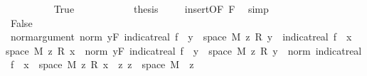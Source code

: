 \begin{isabellebody}
\ \ \ \ \ \ \ \ \isamarkupfalse%
\ True\isanewline
\ \ \ \ \ \ \ \ \isamarkupfalse%
\ \isamarkupfalse%
\ {\isacharquery}{\kern0pt}thesis\ \isamarkupfalse%
\ {\isacharasterisk}{\kern0pt}\ \isamarkupfalse%
\ insert{\isacharparenleft}{\kern0pt}{}{\isacharparenright}{\kern0pt}{\isacharbrackleft}{\kern0pt}OF\ F{\isacharbrackright}{\kern0pt}\ \isamarkupfalse%
\ simp\isanewline
\ \ \ \ \ \ \isamarkupfalse%
\isanewline
\ \ \ \ \ \ \ \ \isamarkupfalse%
\ False\isanewline
\ \ \ \ \ \ \ \ \isamarkupfalse%
\ norm{\isacharunderscore}{\kern0pt}argument{\isacharcolon}{\kern0pt}\ {\isachardoublequoteopen}norm\ {\isacharparenleft}{\kern0pt}{\isacharparenleft}{\kern0pt}{\isasymSum}y{\isasymin}F{\isachardot}{\kern0pt}\ indicat{\isacharunderscore}{\kern0pt}real\ {\isacharparenleft}{\kern0pt}f\ {\isacharminus}{\kern0pt}{\isacharbackquote}{\kern0pt}\ {\isacharbraceleft}{\kern0pt}y{\isacharbraceright}{\kern0pt}\ {\isasyminter}\ space\ M{\isacharparenright}{\kern0pt}\ z\ {\isacharasterisk}{\kern0pt}\isactrlsub R\ y{\isacharparenright}{\kern0pt}\ {\isacharplus}{\kern0pt}\ indicat{\isacharunderscore}{\kern0pt}real\ {\isacharparenleft}{\kern0pt}f\ {\isacharminus}{\kern0pt}{\isacharbackquote}{\kern0pt}\ {\isacharbraceleft}{\kern0pt}x{\isacharbraceright}{\kern0pt}\ {\isasyminter}\ space\ M{\isacharparenright}{\kern0pt}\ z\ {\isacharasterisk}{\kern0pt}\isactrlsub R\ x{\isacharparenright}{\kern0pt}\ {\isacharequal}{\kern0pt}\ norm\ {\isacharparenleft}{\kern0pt}{\isasymSum}y{\isasymin}F{\isachardot}{\kern0pt}\ indicat{\isacharunderscore}{\kern0pt}real\ {\isacharparenleft}{\kern0pt}f\ {\isacharminus}{\kern0pt}{\isacharbackquote}{\kern0pt}\ {\isacharbraceleft}{\kern0pt}y{\isacharbraceright}{\kern0pt}\ {\isasyminter}\ space\ M{\isacharparenright}{\kern0pt}\ z\ {\isacharasterisk}{\kern0pt}\isactrlsub R\ y{\isacharparenright}{\kern0pt}\ {\isacharplus}{\kern0pt}\ norm\ {\isacharparenleft}{\kern0pt}indicat{\isacharunderscore}{\kern0pt}real\ {\isacharparenleft}{\kern0pt}f\ {\isacharminus}{\kern0pt}{\isacharbackquote}{\kern0pt}\ {\isacharbraceleft}{\kern0pt}x{\isacharbraceright}{\kern0pt}\ {\isasyminter}\ space\ M{\isacharparenright}{\kern0pt}\ z\ {\isacharasterisk}{\kern0pt}\isactrlsub R\ x{\isacharparenright}{\kern0pt}{\isachardoublequoteclose}\ \ z{\isacharcolon}{\kern0pt}\ {\isachardoublequoteopen}z\ {\isasymin}\ space\ M{\isachardoublequoteclose}\ \ z\isanewline
\ \ \ \ \ \ \ \ \isamarkupfalse%

\end{isabellebody}
